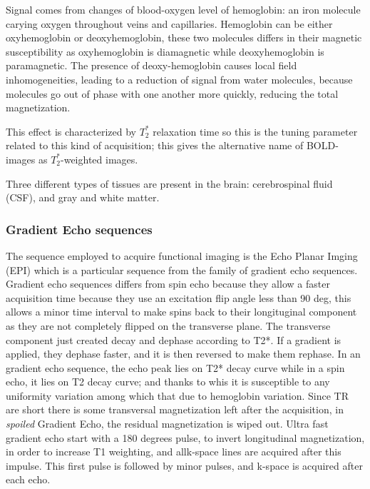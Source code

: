 \documentclass[a4paper,11pt]{article}
\begin{document}
Signal comes from changes of blood-oxygen level of hemoglobin: an iron molecule carying oxygen throughout veins and capillaries.
Hemoglobin can be either oxyhemoglobin or deoxyhemoglobin, these two molecules differs in their magnetic susceptibility as oxyhemoglobin is diamagnetic while deoxyhemoglobin is paramagnetic.
The presence of deoxy-hemoglobin causes local field inhomogeneities, leading to a reduction of signal from water molecules, because molecules go out of phase with one another more quickly, reducing the total magnetization.

This effect is characterized by $T_2^{\ast}$ relaxation time so this is the tuning parameter related to this kind of acquisition; this gives the alternative name of BOLD-images as $T_2^{\ast}$-weighted images.


Three different types of tissues are present in the brain: cerebrospinal fluid (CSF), and gray and white matter.
\subsubsection{Gradient Echo sequences}
The sequence employed to acquire functional imaging is the Echo Planar Imging (EPI) which is a particular sequence from the family of gradient echo sequences.
Gradient echo sequences differs from spin echo because they allow a faster acquisition time because they use an excitation flip angle less than 90 deg, this allows a minor time interval to make spins back to their longituginal component as they are not completely flipped on the transverse plane.
The transverse component just created decay and dephase according to T2*. If a gradient is applied, they dephase faster, and it is then reversed to make them rephase.
In an gradient echo sequence, the echo peak lies on T2* decay curve while in a spin echo, it lies on T2 decay curve; and thanks to whis it is susceptible to any uniformity variation among which that due to hemoglobin variation.
Since TR are short there is some transversal magnetization left after the acquisition, in \emph{spoiled} Gradient Echo, the residual magnetization is wiped out.
Ultra fast gradient echo start with a 180 degrees pulse, to invert longitudinal magnetization, in order to increase T1 weighting, and allk-space lines are acquired after this impulse. This first pulse is followed by minor pulses, and k-space is acquired after each echo.
\end{document}
